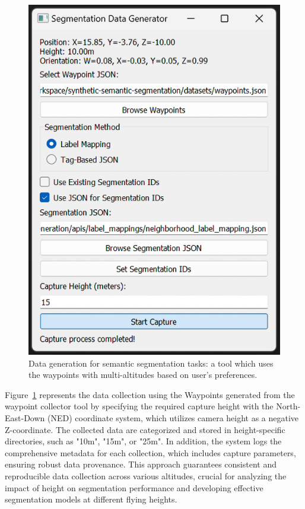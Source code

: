 \documentclass[../report.tex]{subfiles}
\begin{document}
     \begin{figure}[ht]
        \centering
        \includegraphics[width=0.9\linewidth]{figures/segmentation_data_generator.png}
        \caption{Data generation for semantic segmentation tasks: a tool which uses the waypoints with multi-altitudes based on user's preferences.}
        \label{fig:segmentation_data_generator}
    \end{figure}
    
     Figure~\ref{fig:segmentation_data_generator} represents the data collection using the Waypoints generated from the waypoint collector tool by specifying the required capture height with the North-East-Down (NED) coordinate system, which utilizes camera height as a negative Z-coordinate. The collected data are categorized and stored in height-specific directories, such as "10m", "15m", or "25m". In addition, the system logs the comprehensive metadata for each collection, which includes capture parameters, ensuring robust data provenance. This approach guarantees consistent and reproducible data collection across various altitudes, crucial for analyzing the impact of height on segmentation performance and developing effective segmentation models at different flying heights.
\end{document}
